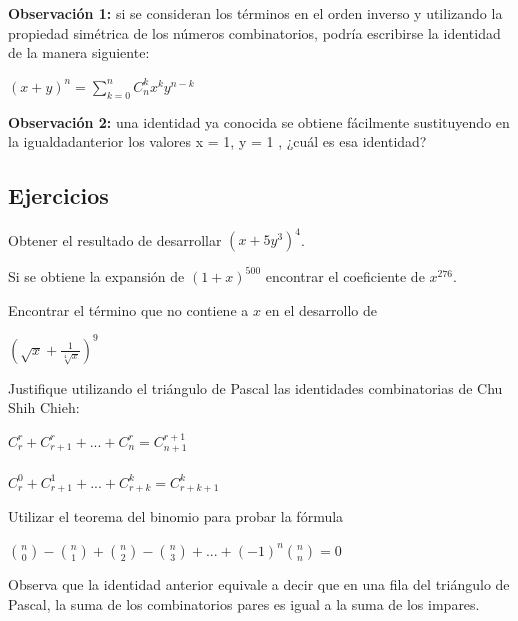 \documentclass[12pt]{article}
\begin{document}
\textbf{Observación 1:} si se consideran los términos en el orden inverso y utilizando la propiedad simétrica de los números combinatorios, podría escribirse la identidad de la manera siguiente:

\begin{center}
    $(x+y)^n=\displaystyle \sum_{k=0}^{n} C^{k}_{n} x^{k} y^{n-k}$
\end{center}

\textbf{Observación 2:} una identidad ya conocida se obtiene fácilmente sustituyendo en la igualdadanterior los valores x = 1, y = 1 , ¿cuál es esa identidad?

\subsection{Ejercicios}

\begin{ejercicio}
    Obtener el resultado de desarrollar $(x+ 5y^3)^4$.
\end{ejercicio}

\begin{ejercicio}
    Si se obtiene la expansión de $(1 +x)^{500}$ encontrar el coeficiente de $x^{276}$.
\end{ejercicio}

\begin{ejercicio}
    Encontrar el término que no contiene a $x$ en el desarrollo de

    \begin{center}
        $(\sqrt{x} + \frac{1}{\sqrt[4]{x}})^9$
    \end{center}
\end{ejercicio}

\begin{ejercicio}
    Justifique utilizando el triángulo de Pascal las identidades combinatorias de Chu Shih Chieh:

    \begin{center}
        $C^{r}_{r} + C^{r}_{r+1} + ... + C^{r}_{n} = C^{r+1}_{n+1}$ \\ \hfill \\
        $C^{0}_{r} + C^{1}_{r+1} + ... + C^{k}_{r+k} = C^{k}_{r+k+1}$
    \end{center}
\end{ejercicio}

\begin{ejercicio}
    Utilizar el teorema del binomio para probar la fórmula

    \begin{center}
        $\binom{n}{0} - \binom{n}{1} + \binom{n}{2} - \binom{n}{3} + ... + (-1)^n \binom{n}{n} = 0$
    \end{center}

    Observa que la identidad anterior equivale a decir que en una fila del triángulo de Pascal, la suma de los combinatorios pares es igual a la suma de los impares.
\end{ejercicio}
\end{document}

